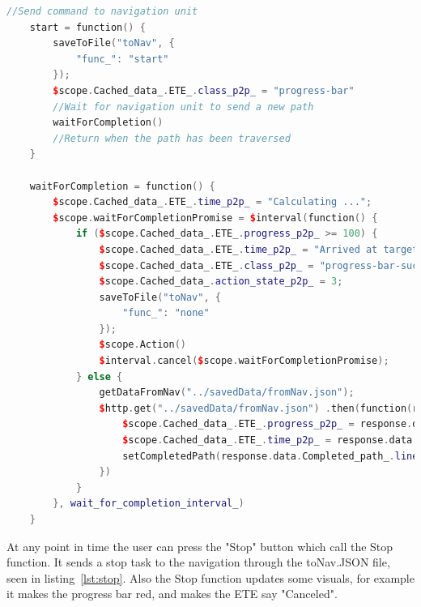 \begin{lstlisting}[caption = {the start and waitForCompletion functions in p2p.js}, captionpos=b, label={lst:start}, language=C++,firstnumber=1]
    //Send command to navigation unit
    start = function() {
        saveToFile("toNav", {
            "func_": "start"
        });
        $scope.Cached_data_.ETE_.class_p2p_ = "progress-bar"
        //Wait for navigation unit to send a new path
        waitForCompletion()
        //Return when the path has been traversed
    }

    waitForCompletion = function() {
        $scope.Cached_data_.ETE_.time_p2p_ = "Calculating ...";
        $scope.waitForCompletionPromise = $interval(function() {
            if ($scope.Cached_data_.ETE_.progress_p2p_ >= 100) {
                $scope.Cached_data_.ETE_.time_p2p_ = "Arrived at target";
                $scope.Cached_data_.ETE_.class_p2p_ = "progress-bar-success"
                $scope.Cached_data_.action_state_p2p_ = 3;
                saveToFile("toNav", {
                    "func_": "none"
                });
                $scope.Action()
                $interval.cancel($scope.waitForCompletionPromise);
            } else {
                getDataFromNav("../savedData/fromNav.json");
                $http.get("../savedData/fromNav.json") .then(function(response) {
					$scope.Cached_data_.ETE_.progress_p2p_ = response.data.Progress_.percentage_;
                    $scope.Cached_data_.ETE_.time_p2p_ = response.data.Progress_.ete_;
                    setCompletedPath(response.data.Completed_path_.line_);
                })
            }
        }, wait_for_completion_interval_)
    }
\end{lstlisting}

At any point in time the user can press the "Stop" button which call the Stop function. It sends a stop task to the navigation through the toNav.JSON file, seen in listing~\ref{lst:stop}. Also the Stop function updates some visuals, for example it makes the progress bar red, and makes the ETE say "Canceled".


